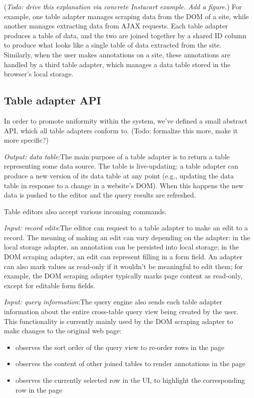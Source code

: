 \documentclass[sigplan,10pt,anonymous,review]{acmart}
\providecommand{\tightlist}{%
  \setlength{\itemsep}{0pt}\setlength{\parskip}{0pt}}
\begin{document}
(\emph{Todo: drive this explanation via concrete Instacart example. Add
a figure.}) For example, one table adapter manages scraping data from
the DOM of a site, while another manages extracting data from AJAX
requests. Each table adapter produces a table of data, and the two are
joined together by a shared ID column to produce what looks like a
single table of data extracted from the site. Similarly, when the user
makes annotations on a site, these annotations are handled by a third
table adapter, which manages a data table stored in the browser's local
storage.

\hypertarget{table-adapter-api}{%
\subsection{Table adapter API}\label{table-adapter-api}}

In order to promote uniformity within the system, we've defined a small
abstract API, which all table adapters conform to. (Todo: formalize this
more, make it more specific?)

\emph{Output: data table}:The main purpose of a table adapter is to
return a table representing some data source. The table is
live-updating: a table adapter can produce a new version of its data
table at any point (e.g., updating the data table in response to a
change in a website's DOM). When this happens the new data is pushed to
the editor and the query results are refreshed.

Table editors also accept various incoming commands.

\emph{Input: record edits}:The editor can request to a table adapter to
make an edit to a record. The meaning of making an edit can vary
depending on the adapter: in the local storage adapter, an annotation
can be persisted into local storage; in the DOM scraping adapter, an
edit can represent filling in a form field. An adapter can also mark
values as read-only if it wouldn't be meaningful to edit them; for
example, the DOM scraping adapter typically marks page content as
read-only, except for editable form fields.

\emph{Input: query information}:The query engine also sends each table
adapter information about the entire cross-table query view being
created by the user. This functionality is currently mainly used by the
DOM scraping adapter to make changes to the original web page:

\begin{itemize}
\tightlist
\item
  observes the sort order of the query view to re-order rows in the page
\item
  observes the content of other joined tables to render annotations in
  the page
\item
  observes the currently selected row in the UI, to highlight the
  corresponding row in the page
\end{itemize}
\end{document}
